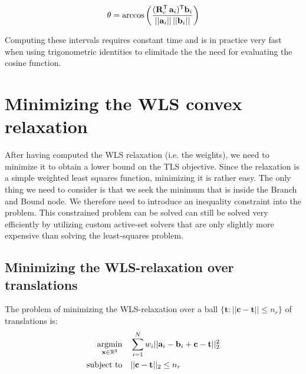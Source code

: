 \begin{equation}
	\begin{aligned}
		\theta = \arccos \left( \frac{(\mathbf{R}_c^{\mathsf{T}} \, \mathbf{a}_i )^{\mathsf{T}} \mathbf{b}_i}{|| \mathbf{a}_i || \, || \mathbf{b}_i ||} \right)
	\end{aligned}
\end{equation}

Computing these intervals requires constant time and is in practice very fast when using trigonometric identities to elimitade the the need for evaluating the cosine function.


\section{Minimizing the WLS convex relaxation}
After having computed the WLS relaxation (i.e. the weights), we need to minimize it to obtain a lower bound on the TLS objective. 
Since the relaxation is a simple weighted least squares function, minimizing it is rather easy. The only thing we need to consider is that we seek the minimum that is inside the Branch and Bound node. We therefore need to introduce an inequality constraint into the problem.
This constrained problem can be solved can still be solved very efficiently by utilizing custom active-set solvers that are only slightly more expensive than solving the least-squares problem.

\subsection{Minimizing the WLS-relaxation over translations}

The problem of minimizing the WLS-relaxation over a ball $\{ \mathbf{t} : || \mathbf{c} - \mathbf{t} || \leq n_r \}$ of translations is:
\begin{equation}
	\label{eq:tls-twls-constrained}
	\begin{aligned}
		\operatorname*{argmin}_{\mathbf{x} \in \mathbb{R}^3} \quad &\sum_{i=1}^{N} w_i ||\mathbf{a}_i - \mathbf{b}_i + \mathbf{c} - \mathbf{t}||_2^2 \\
		\text{subject to} \quad  &||\mathbf{c} - \mathbf{t}||_2 \leq n_r
	\end{aligned}
\end{equation}

